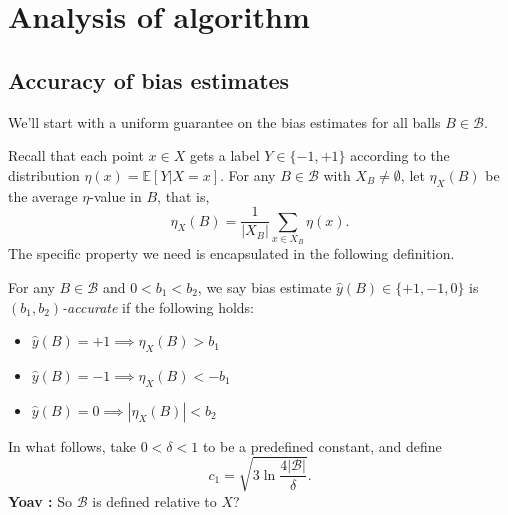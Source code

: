 \documentclass[anon,12pt]{colt2022} %
\def\E{{\mathbb E}}
\def\B{{\mathcal B}}
\def\yh{{\widehat{y}}}
\newcommand{\comment}[3]{{\color{#1} {\bf #2 :} #3}}
\newcommand{\yoav}[1]{\comment{blue}{Yoav}{#1}}
\begin{document}
\section{Analysis of algorithm}

\subsection{Accuracy of bias estimates}

We'll start with a uniform guarantee on the bias estimates for all balls $B \in \B$.

Recall that each point $x \in X$ gets a label $Y \in \{-1,+1\}$ according to the distribution $\eta(x) = \E[Y | X=x]$. For any $B \in \B$ with $X_B \neq \emptyset$, let $\eta_X(B)$ be the average $\eta$-value in $B$, that is,
$$ \eta_X(B) = \frac{1}{|X_B|} \sum_{x \in X_B} \eta(x) .$$
The specific property we need is encapsulated in the following definition.
\begin{definition}
For any $B \in \B$ and $0 < b_1 < b_2$, we say bias estimate $\yh(B) \in \{+1,-1,0\}$ is \emph{$(b_1,b_2)$-accurate} if the following holds:
\begin{itemize}
\item $\yh(B) = +1 \implies \eta_X(B) > b_1$
\item $\yh(B) = -1 \implies \eta_X(B) < -b_1$
\item $\yh(B) = 0 \implies |\eta_X(B)| < b_2$
\end{itemize}
\label{def:accurate-bias-estimate}
\end{definition}

In what follows, take $0 < \delta < 1$ to be a predefined constant, and define
\begin{equation}
c_1 = \sqrt{3 \ln \frac{4|\B|}{\delta}} .
\label{eq:c1}
\end{equation}
\yoav{So $\B$ is defined relative to $X$?}
\end{document}
